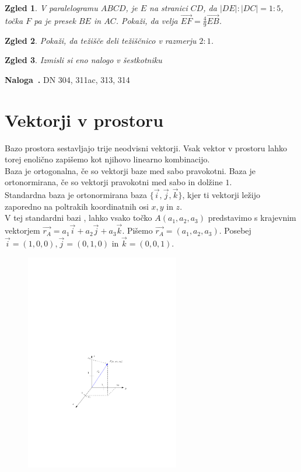 \documentclass{article}
\newcounter{example}[section]
\newenvironment{example}[1][]{\refstepcounter{example}\par\medskip
   \noindent \textbf{Naloga~\theexample. #1} \rmfamily}{\medskip}
\newtheorem*{zgled}{Zgled}
\begin{document}
\begin{zgled}
    V paralelogramu $ABCD$, je $E$ na stranici $CD$, da $|DE|:|DC|=1:5$, točka $F$ pa je presek $BE$ in $AC$. Pokaži, da velja $\vec{EF}=\frac{4}{9}\vec{EB}$.
\end{zgled}

\begin{zgled}
    Pokaži, da težišče deli težiščnico v razmerju $2:1$.
\end{zgled}

\begin{zgled}
    Izmisli si eno nalogo v šestkotniku
\end{zgled}

\begin{example}
    DN 304, 311ac, 313, 314
\end{example}


\section{Vektorji v prostoru}

Bazo prostora sestavljajo trije neodvisni vektorji. Vsak vektor v prostoru lahko torej enolično zapišemo kot njihovo linearno kombinacijo.\\
Baza je ortogonalna, če so vektorji baze med sabo pravokotni. Baza je ortonormirana, če so vektorji pravokotni med sabo in dolžine $1$.\\
Standardna baza je ortonormirana baza $\{\vec{i},\vec{j},\vec{k}\}$, kjer ti vektorji ležijo zaporedno na poltrakih koordinatnih osi $x,y$ in $z$.\\
V tej standardni bazi , lahko vsako točko $A(a_1,a_2,a_3)$ predstavimo s krajevnim vektorjem $\vec{r_A}=a_1 \vec{i}+a_2\vec{j}+a_3\vec{k}$. Pišemo $\vec{r_A}=(a_1,a_2,a_3)$. Posebej $\vec{i}=(1,0,0) , \vec{j}=(0,1,0)$ in $\vec{k}=(0,0,1)$.

\begin{figure}[H]
\includegraphics[width=0.6\textwidth]{vektorji_slika.pdf}
\centering
\end{figure}
\end{document}
